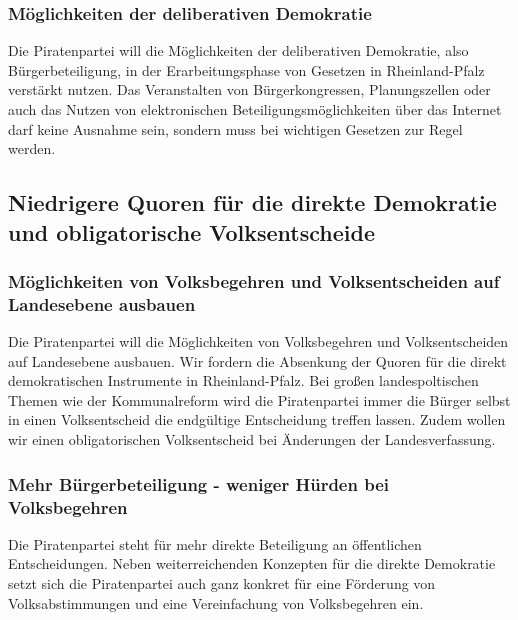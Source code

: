 \subsubsection{Möglichkeiten der deliberativen Demokratie}
\abstimmung
Die Piratenpartei will die Möglichkeiten der deliberativen Demokratie, also Bürgerbeteiligung, in der Erarbeitungsphase von Gesetzen in Rheinland-Pfalz verstärkt nutzen. Das Veranstalten von Bürgerkongressen, Planungszellen oder auch das Nutzen von elektronischen Beteiligungsmöglichkeiten über das Internet darf keine Ausnahme sein, sondern muss bei wichtigen Gesetzen zur Regel werden.
 
\subsection*{Niedrigere Quoren für die direkte Demokratie und obligatorische Volksentscheide}
\label{wp:demokratie:niedrig}

\subsubsection{Möglichkeiten von Volksbegehren und Volksentscheiden auf Landesebene ausbauen}
\abstimmung
Die Piratenpartei will die Möglichkeiten von Volksbegehren und Volksentscheiden auf Landesebene ausbauen. Wir fordern die Absenkung der Quoren für die direkt demokratischen Instrumente in Rheinland-Pfalz. Bei großen landespoltischen Themen wie der Kommunalreform wird die Piratenpartei immer die Bürger selbst in einen Volksentscheid die endgültige Entscheidung treffen lassen. Zudem wollen wir einen obligatorischen Volksentscheid bei Änderungen der Landesverfassung.
 
\label{wp:demokratie:mehr}

\subsubsection{Mehr Bürgerbeteiligung - weniger Hürden bei Volksbegehren}
\abstimmung
Die Piratenpartei steht für mehr direkte Beteiligung an öffentlichen Entscheidungen. Neben weiterreichenden Konzepten für die direkte Demokratie setzt sich die Piratenpartei auch ganz konkret für eine Förderung von Volksabstimmungen und eine Vereinfachung von Volksbegehren ein.

